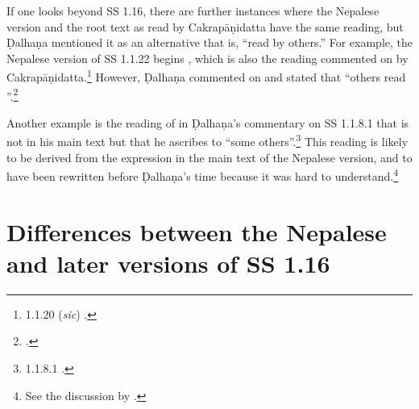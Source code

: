 If one looks beyond SS 1.16, there are further instances where the Nepalese version and
the root text as read by Cakrapāṇidatta have the same reading, but Ḍalhaṇa
mentioned it as an alternative that is, “read by others.” For example, the Nepalese
version of SS 1.1.22 begins , which is also
the reading commented on by Cakrapāṇidatta.\footnote{1.1.20 (\emph{sic})
    \citep[17]{acar-1939}.} However, Ḍalhaṇa commented on  and
    stated that “others read ”.\footnote{.}
        
Another example is the reading of  in Ḍalhaṇa's commentary
on SS 1.1.8.1 that is not in his main text but that he ascribes to “some
others”.\footnote{1.1.8.1 \citep[3]{vulgate}.} This reading is likely to be derived  from 
the 
expression  in the main text of the Nepalese version, and to 
have been rewritten before Ḍalhaṇa's time because it was hard to 
understand.\footnote{See the discussion by \citet[4--5]{birc-2021a}.}


\section{Differences between the Nepalese and later versions of SS 
1.16}


